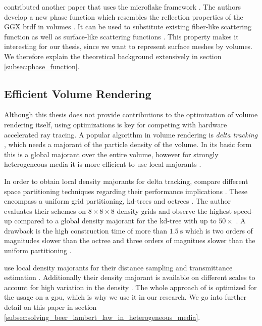 \citeauthor{sggx} contributed another paper that uses the microflake framework \cite{sggx}.
The authors develop a new phase function which resembles the reflection properties of the GGX \ac{brdf} in volumes \cite{sggx}.
It can be used to substitute existing fiber-like scattering function as well as surface-like scattering functions \cite{sggx}.
This property makes it interesting for our thesis, since we want to represent surface meshes by volumes.
We therefore explain the theoretical background extensively in section \ref{subsec:phase_function}.

\subsection{Efficient Volume Rendering}
Although this thesis does not provide contributions to the optimization of volume rendering itself, using optimizations is key for competing with hardware accelerated ray tracing.
A popular algorithm in volume rendering is \textit{delta tracking} \cite{woodcock}, which needs a majorant of the particle density of the volume.
In its basic form this is a global majorant over the entire volume, however for strongly heterogeneous media it is more efficient to use local majorants \cite{novak_overview}.

In order to obtain local density majorants for delta tracking, \citeauthor{yue_space_partitioning} compare different space partitioning techniques regarding their performance implications \cite{yue_space_partitioning}.
These encompass a uniform grid partitioning, kd-trees and octrees \cite{yue_space_partitioning}.
The author evaluates their schemes on $8\times8\times8$ density grids and observe the highest speed-up compared to a global density majorant for the kd-tree with up to ${50\times}$ \cite{yue_space_partitioning}.
A drawback is the high construction time of more than $\SI{1.5}{\s}$ which is two orders of magnitudes slower than the octree and three orders of magnitues slower than the uniform partitioning \cite{yue_space_partitioning}.

\citeauthor{brick_grid} use local density majorants for their distance sampling and transmittance estimation \cite{brick_grid}.
Additionally their density majorant is available on different scales to account for high variation in the density \cite{brick_grid}.
The whole approach of \citeauthor{brick_grid} is optimized for the usage on a \ac{gpu}, which is why we use it in our research.
We go into further detail on this paper in section \ref{subsec:solving_beer_lambert_law_in_heterogeneous_media}.

